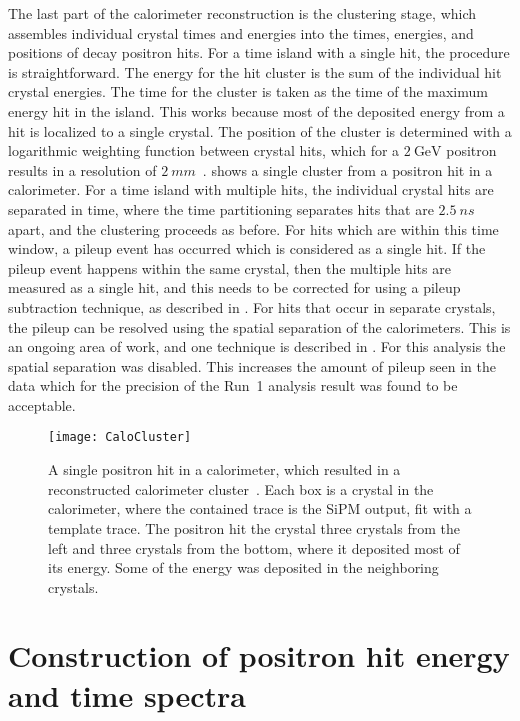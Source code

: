 The last part of the calorimeter reconstruction is the clustering stage, which assembles individual crystal times and energies into the times, energies, and positions of decay positron hits. For a time island with a single hit, the procedure is straightforward. The energy for the hit cluster is the sum of the individual hit crystal energies. The time for the cluster is taken as the time of the maximum energy hit in the island. This works because most of the deposited energy from a hit is localized to a single crystal. The position of the cluster is determined with a logarithmic weighting function between crystal hits, which for a $\SI{2}{\GeV}$ positron results in a resolution of $\SI{2}{mm}$~\cite{AFThesis}.  shows a single cluster from a positron hit in a calorimeter. For a time island with multiple hits, the individual crystal hits are separated in time, where the time partitioning separates hits that are $\SI{2.5}{ns}$ apart, and the clustering proceeds as before. For hits which are within this time window, a pileup event has occurred which is considered as a single hit. If the pileup event happens within the same crystal, then the multiple hits are measured as a single hit, and this needs to be corrected for using a pileup subtraction technique, as described in . For hits that occur in separate crystals, the pileup can be resolved using the spatial separation of the calorimeters. This is an ongoing area of work, and one technique is described in . For this analysis the spatial separation was disabled. This increases the amount of pileup seen in the data which for the precision of the Run~1 analysis result was found to be acceptable. 


\begin{figure}
    \centering
    \texttt{[image: CaloCluster]}
    \caption[Calorimeter cluster from SiPM traces fit with templates]{A single positron hit in a calorimeter, which resulted in a reconstructed calorimeter cluster~\cite{AFThesis}. Each box is a crystal in the calorimeter, where the contained trace is the SiPM output, fit with a template trace. The positron hit the crystal three crystals from the left and three crystals from the bottom, where it deposited most of its energy. Some of the energy was deposited in the neighboring crystals.}
    \label{fig:CaloCluster}
\end{figure}



\section{Construction of positron hit energy and time spectra}
\label{sec:Histogramming}


